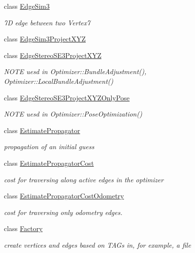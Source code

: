 \begin{DoxyCompactItemize}
class \mbox{\hyperlink{classg2o_1_1_edge_sim3}{Edge\+Sim3}}
\begin{DoxyCompactList}\small\item\em 7D edge between two Vertex7 \end{DoxyCompactList}\item 
class \mbox{\hyperlink{classg2o_1_1_edge_sim3_project_x_y_z}{Edge\+Sim3\+Project\+X\+YZ}}
\item 
class \mbox{\hyperlink{classg2o_1_1_edge_stereo_s_e3_project_x_y_z}{Edge\+Stereo\+S\+E3\+Project\+X\+YZ}}
\begin{DoxyCompactList}\small\item\em N\+O\+TE uesd in Optimizer\+::\+Bundle\+Adjustment(), Optimizer\+::\+Local\+Bundle\+Adjustment() \end{DoxyCompactList}\item 
class \mbox{\hyperlink{classg2o_1_1_edge_stereo_s_e3_project_x_y_z_only_pose}{Edge\+Stereo\+S\+E3\+Project\+X\+Y\+Z\+Only\+Pose}}
\begin{DoxyCompactList}\small\item\em N\+O\+TE uesd in Optimizer\+::\+Pose\+Optimization() \end{DoxyCompactList}\item 
class \mbox{\hyperlink{classg2o_1_1_estimate_propagator}{Estimate\+Propagator}}
\begin{DoxyCompactList}\small\item\em propagation of an initial guess \end{DoxyCompactList}\item 
class \mbox{\hyperlink{classg2o_1_1_estimate_propagator_cost}{Estimate\+Propagator\+Cost}}
\begin{DoxyCompactList}\small\item\em cost for traversing along active edges in the optimizer \end{DoxyCompactList}\item 
class \mbox{\hyperlink{classg2o_1_1_estimate_propagator_cost_odometry}{Estimate\+Propagator\+Cost\+Odometry}}
\begin{DoxyCompactList}\small\item\em cost for traversing only odometry edges. \end{DoxyCompactList}\item 
class \mbox{\hyperlink{classg2o_1_1_factory}{Factory}}
\begin{DoxyCompactList}\small\item\em create vertices and edges based on T\+A\+Gs in, for example, a file \end{DoxyCompactList}\item 

\end{DoxyCompactItemize}
